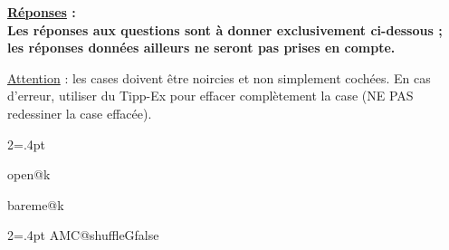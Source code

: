 \documentclass[a4paper]{article}
\begin{document}
{\vspace{0.7cm}

{\noindent \large\bf \underline{Réponses} :}\\

{  \noindent \bf Les réponses aux questions sont à donner exclusivement ci-dessous ; les réponses données ailleurs ne seront pas prises en compte.
}

\noindent   \underline{Attention} : les cases doivent être noircies et non simplement cochées. En cas d'erreur, utiliser du Tipp-Ex pour effacer complètement la case (NE PAS redessiner la case effacée).

\vspace{0.5cm}

\begin{multicols}{2}\columnseprule=.4pt

\formulaire

\end{multicols}

\ifcsname open@k\endcsname{}\fi

\ifcsname bareme@k\endcsname
\begin{tcolorbox}[title=R\'eserv\'e correcteur, colback=white, colframe=black!55, fonttitle=\bfseries\small, boxrule=0.5pt, arc=2pt, left=4pt, right=4pt, top=2pt, bottom=2pt, before skip=8pt, after skip=4pt]
\begin{multicols}{2}\columnseprule=.4pt
{\csname AMC@shuffleGfalse\endcsname{}}
\end{multicols}
\end{tcolorbox}
\fi
}
\end{document}
